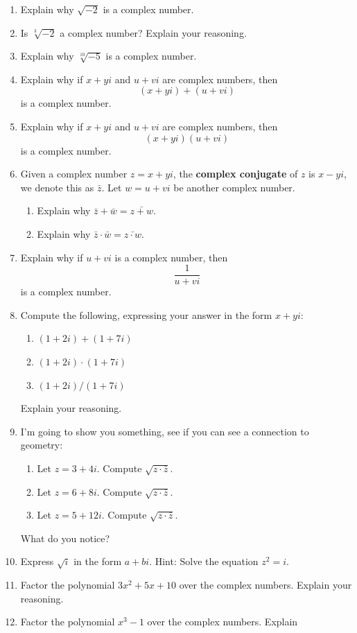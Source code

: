\begin{problems}
\begin{enumerate}
\item Explain why $\sqrt{-2}$ is a complex number. 
\item Is $\sqrt[3]{-2}$ a complex number? Explain your reasoning.
\item Explain why $\sqrt[10]{-5}$ is a complex number.
\item Explain why if $x+yi$ and $u+vi$ are complex numbers, then 
\[
(x+yi) +(u+vi)
\]
is a complex number.
\item Explain why if $x+yi$ and $u+vi$ are complex numbers, then 
\[
(x+yi)(u+vi)
\]
is a complex number.
\item Given a complex number $z = x + yi$, the \textbf{complex conjugate} of
  $z$ is $x-yi$, we denote this as $\bar{z}$. Let $w = u+vi$ be
  another complex number.
\begin{enumerate}
\item Explain why $\bar{z}+\bar{w} = \bar{z+w}$.
\item Explain why $\bar{z}\cdot\bar{w} = \bar{z\cdot w}$.
\end{enumerate}
\item Explain why if $u+vi$ is a complex number, then
\[
\frac{1}{u+vi}
\]
is a complex number.
\item Compute the following, expressing your answer in the form
  $x + yi$:
\begin{enumerate}
\item $(1 + 2i)+ (1+7i)$
\item $(1 + 2i)\cdot (1+7i)$
\item $(1 + 2i)/(1+7i)$
\end{enumerate}
Explain your reasoning.
\item I'm going to show you something, see if you can see a connection to geometry:
\begin{enumerate}
\item Let $z = 3 + 4i$. Compute $\sqrt{z\cdot \bar{z}}$. 
\item Let $z = 6 + 8i$. Compute $\sqrt{z\cdot \bar{z}}$. 
\item Let $z = 5 + 12i$. Compute $\sqrt{z\cdot \bar{z}}$. 
\end{enumerate}
What do you notice?
\item\label{P:sqrti} Express $\sqrt{i}$ in the form $a + bi$. Hint: Solve the
  equation $z^2 = i$.
\item Factor the polynomial $3x^2 + 5x + 10$ over the complex
  numbers. Explain your reasoning.
\item Factor the polynomial $x^3-1$ over the complex numbers. Explain

\end{enumerate}
\end{problems}

